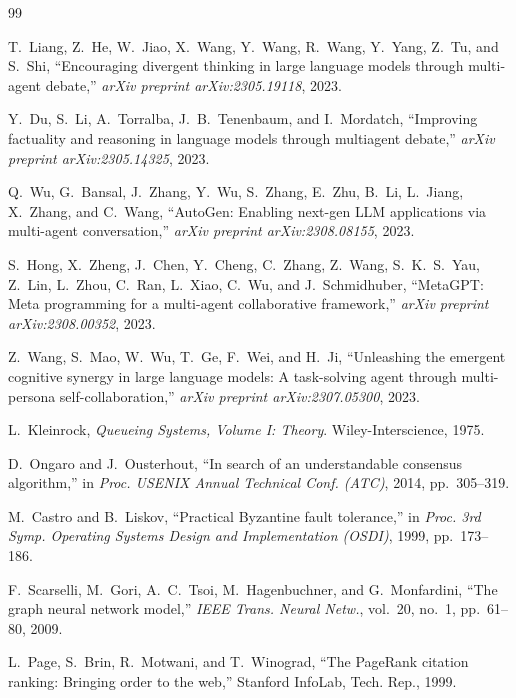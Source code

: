 \documentclass[conference]{IEEEtran}
\begin{document}
\begin{thebibliography}{99}

T.~Liang, Z.~He, W.~Jiao, X.~Wang, Y.~Wang, R.~Wang, Y.~Yang, Z.~Tu, and S.~Shi, ``Encouraging divergent thinking in large language models through multi-agent debate,'' \emph{arXiv preprint arXiv:2305.19118}, 2023.

Y.~Du, S.~Li, A.~Torralba, J.~B.~Tenenbaum, and I.~Mordatch, ``Improving factuality and reasoning in language models through multiagent debate,'' \emph{arXiv preprint arXiv:2305.14325}, 2023.

Q.~Wu, G.~Bansal, J.~Zhang, Y.~Wu, S.~Zhang, E.~Zhu, B.~Li, L.~Jiang, X.~Zhang, and C.~Wang, ``{AutoGen}: Enabling next-gen {LLM} applications via multi-agent conversation,'' \emph{arXiv preprint arXiv:2308.08155}, 2023.

S.~Hong, X.~Zheng, J.~Chen, Y.~Cheng, C.~Zhang, Z.~Wang, S.~K.~S.~Yau, Z.~Lin, L.~Zhou, C.~Ran, L.~Xiao, C.~Wu, and J.~Schmidhuber, ``{MetaGPT}: Meta programming for a multi-agent collaborative framework,'' \emph{arXiv preprint arXiv:2308.00352}, 2023.

Z.~Wang, S.~Mao, W.~Wu, T.~Ge, F.~Wei, and H.~Ji, ``Unleashing the emergent cognitive synergy in large language models: A task-solving agent through multi-persona self-collaboration,'' \emph{arXiv preprint arXiv:2307.05300}, 2023.

L.~Kleinrock, \emph{Queueing Systems, Volume I: Theory}. Wiley-Interscience, 1975.

D.~Ongaro and J.~Ousterhout, ``In search of an understandable consensus algorithm,'' in \emph{Proc. USENIX Annual Technical Conf. (ATC)}, 2014, pp.~305--319.

M.~Castro and B.~Liskov, ``Practical Byzantine fault tolerance,'' in \emph{Proc. 3rd Symp. Operating Systems Design and Implementation (OSDI)}, 1999, pp.~173--186.

F.~Scarselli, M.~Gori, A.~C.~Tsoi, M.~Hagenbuchner, and G.~Monfardini, ``The graph neural network model,'' \emph{IEEE Trans. Neural Netw.}, vol.~20, no.~1, pp.~61--80, 2009.

L.~Page, S.~Brin, R.~Motwani, and T.~Winograd, ``The {PageRank} citation ranking: Bringing order to the web,'' Stanford InfoLab, Tech. Rep., 1999.


\end{thebibliography}
\end{document}
